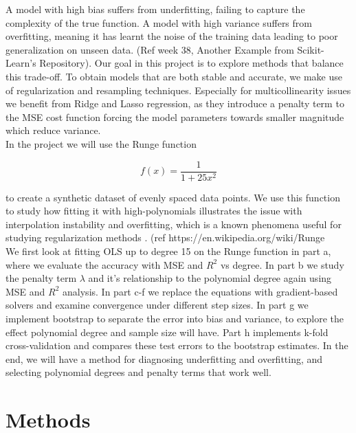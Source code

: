 \documentclass[amssymb,twocolumn,aps]{revtex4}
\begin{document}
A model with high bias suffers from underfitting, failing to capture the complexity of the true function. A model with high variance suffers from overfitting, meaning it has learnt the noise of the training data leading to poor generalization on unseen data. (Ref week 38, Another Example from Scikit-Learn’s Repository). Our goal in this project is to explore methods that balance this trade-off. To obtain models that are both stable and accurate, we make use of regularization and resampling techniques. Especially for multicollinearity issues we benefit from Ridge and Lasso regression, as they introduce a penalty term to the MSE cost function forcing the model parameters towards smaller magnitude which reduce variance. \\

In the project we will use the Runge function

\begin{equation}
    f(x) = \frac{1}{1 + 25x^2}
\end{equation}

to create a synthetic dataset of evenly spaced data points. We use this function to study how fitting it with high-polynomials illustrates the issue with interpolation instability and overfitting, which is a known phenomena useful for studying regularization methods \cite{compfys}. (ref https://en.wikipedia.org/wiki/Runge%
\\
We first look at fitting OLS up to degree 15 on the Runge function in part a, where we evaluate the accuracy with MSE and $R^2$ vs degree. In part b we study the penalty term $\lambda$ and it's relationship to the polynomial degree again using MSE and $R^2$ analysis. In part c-f we replace the equations with gradient-based solvers and examine convergence under different step sizes. In part g we implement bootstrap to separate the error into bias and variance, to explore the effect polynomial degree and sample size will have. Part h implements k-fold cross-validation and compares these test errors to the bootstrap estimates. In the end, we will have a method for diagnosing underfitting and overfitting, and selecting polynomial degrees and penalty terms that work well.  


    
\section{Methods}\label{section:methods}
\end{document}
